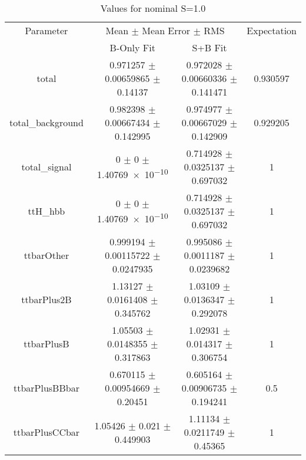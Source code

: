 \begin{table}
\centering
\caption{Values for nominal S=1.0}
\begin{tabular}{cccc}
\toprule
Parameter & \multicolumn{2}{c}{Mean $\pm$ Mean Error $\pm$ RMS} & Expectation\\
 & B-Only Fit & S+B Fit & \\
\midrule
total & \num{0.971257} $\pm$ \num{0.00659865} $\pm$ \num{0.14137} & \num{0.972028} $\pm$ \num{0.00660336} $\pm$ \num{0.141471} & \num{0.930597}\\
total\_background & \num{0.982398} $\pm$ \num{0.00667434} $\pm$ \num{0.142995} & \num{0.974977} $\pm$ \num{0.00667029} $\pm$ \num{0.142909} & \num{0.929205}\\
total\_signal & \num{0} $\pm$ \num{0} $\pm$ \num{1.40769e-10} & \num{0.714928} $\pm$ \num{0.0325137} $\pm$ \num{0.697032} & \num{1}\\
ttH\_hbb & \num{0} $\pm$ \num{0} $\pm$ \num{1.40769e-10} & \num{0.714928} $\pm$ \num{0.0325137} $\pm$ \num{0.697032} & \num{1}\\
ttbarOther & \num{0.999194} $\pm$ \num{0.00115722} $\pm$ \num{0.0247935} & \num{0.995086} $\pm$ \num{0.0011187} $\pm$ \num{0.0239682} & \num{1}\\
ttbarPlus2B & \num{1.13127} $\pm$ \num{0.0161408} $\pm$ \num{0.345762} & \num{1.03109} $\pm$ \num{0.0136347} $\pm$ \num{0.292078} & \num{1}\\
ttbarPlusB & \num{1.05503} $\pm$ \num{0.0148355} $\pm$ \num{0.317863} & \num{1.02931} $\pm$ \num{0.014317} $\pm$ \num{0.306754} & \num{1}\\
ttbarPlusBBbar & \num{0.670115} $\pm$ \num{0.00954669} $\pm$ \num{0.20451} & \num{0.605164} $\pm$ \num{0.00906735} $\pm$ \num{0.194241} & \num{0.5}\\
ttbarPlusCCbar & \num{1.05426} $\pm$ \num{0.021} $\pm$ \num{0.449903} & \num{1.11134} $\pm$ \num{0.0211749} $\pm$ \num{0.45365} & \num{1}\\
\bottomrule
\end{tabular}
\end{table}